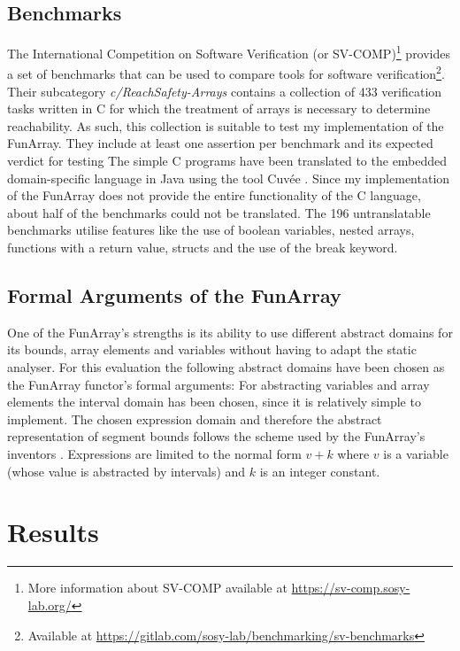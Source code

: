 \documentclass{report}
\begin{document}
\subsection{Benchmarks}

The International Competition on Software Verification (or SV-COMP)\footnote{More information about SV-COMP available at \url{https://sv-comp.sosy-lab.org/}} provides a set of benchmarks that can be used to compare tools for software verification\footnote{Available at \url{https://gitlab.com/sosy-lab/benchmarking/sv-benchmarks}}. Their subcategory \textit{c/ReachSafety-Arrays} contains a collection of 433 verification tasks written in C for which the treatment of arrays is necessary to determine reachability. As such, this collection is suitable to test my implementation of the FunArray. They include at least one assertion per benchmark and its expected verdict for testing 
The simple C programs have been translated to the embedded domain-specific language in Java using the tool Cuv\'ee \cite{ernst2020}. Since my implementation of the FunArray does not provide the entire functionality of the C language, about half of the benchmarks could not be translated. The 196 untranslatable benchmarks utilise features like the use of boolean variables, nested arrays, functions with a return value, structs and the use of the break keyword.

\subsection{Formal Arguments of the FunArray}

One of the FunArray's strengths is its ability to use different abstract domains for its bounds, array elements and variables without having to adapt the static analyser. For this evaluation the following abstract domains have been chosen as the FunArray functor's formal arguments: For abstracting variables and array elements the interval domain has been chosen, since it is relatively simple to implement. The chosen expression domain and therefore the abstract representation of segment bounds follows the scheme used by the FunArray's inventors \cite[section 7.2]{cousot2011}. Expressions are limited to the normal form $v+k$ where $v$ is a variable (whose value is abstracted by intervals) and $k$ is an integer constant.

\section{Results}
\end{document}
